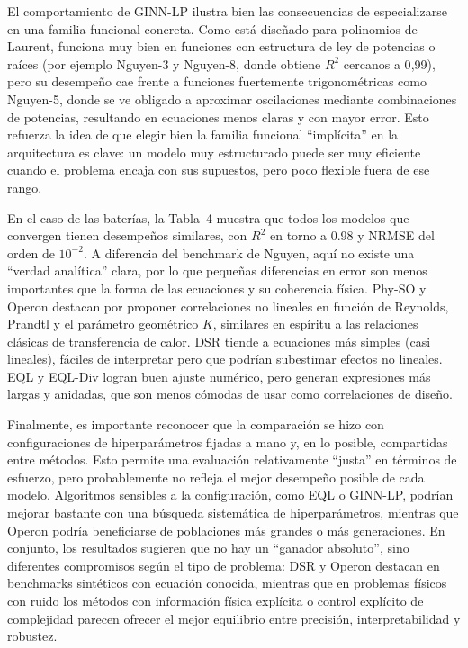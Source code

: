 El comportamiento de GINN-LP ilustra bien las consecuencias de especializarse en una familia funcional concreta. Como está diseñado para polinomios de Laurent, funciona muy bien en funciones con estructura de ley de potencias o raíces (por ejemplo Nguyen-3 y Nguyen-8, donde obtiene $R^2$ cercanos a 0{,}99), pero su desempeño cae frente a funciones fuertemente trigonométricas como Nguyen-5, donde se ve obligado a aproximar oscilaciones mediante combinaciones de potencias, resultando en ecuaciones menos claras y con mayor error. Esto refuerza la idea de que elegir bien la familia funcional “implícita” en la arquitectura es clave: un modelo muy estructurado puede ser muy eficiente cuando el problema encaja con sus supuestos, pero poco flexible fuera de ese rango.

En el caso de las baterías, la Tabla~4 muestra que todos los modelos que convergen tienen desempeños similares, con $R^2$ en torno a 0.98 y NRMSE del orden de $10^{-2}$. A diferencia del benchmark de Nguyen, aquí no existe una “verdad analítica” clara, por lo que pequeñas diferencias en error son menos importantes que la forma de las ecuaciones y su coherencia física. Phy-SO y Operon destacan por proponer correlaciones no lineales en función de Reynolds, Prandtl y el parámetro geométrico $K$, similares en espíritu a las relaciones clásicas de transferencia de calor. DSR tiende a ecuaciones más simples (casi lineales), fáciles de interpretar pero que podrían subestimar efectos no lineales. EQL y EQL-Div logran buen ajuste numérico, pero generan expresiones más largas y anidadas, que son menos cómodas de usar como correlaciones de diseño.

Finalmente, es importante reconocer que la comparación se hizo con configuraciones de hiperparámetros fijadas a mano y, en lo posible, compartidas entre métodos. Esto permite una evaluación relativamente “justa” en términos de esfuerzo, pero probablemente no refleja el mejor desempeño posible de cada modelo. Algoritmos sensibles a la configuración, como EQL o GINN-LP, podrían mejorar bastante con una búsqueda sistemática de hiperparámetros, mientras que Operon podría beneficiarse de poblaciones más grandes o más generaciones. En conjunto, los resultados sugieren que no hay un “ganador absoluto”, sino diferentes compromisos según el tipo de problema: DSR y Operon destacan en benchmarks sintéticos con ecuación conocida, mientras que en problemas físicos con ruido los métodos con información física explícita o control explícito de complejidad parecen ofrecer el mejor equilibrio entre precisión, interpretabilidad y robustez.







